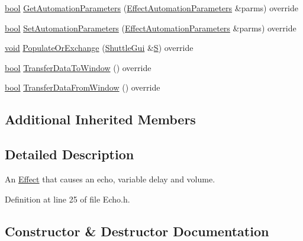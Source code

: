 \begin{DoxyCompactItemize}
\item 
\hyperlink{mac_2config_2i386_2lib-src_2libsoxr_2soxr-config_8h_abb452686968e48b67397da5f97445f5b}{bool} \hyperlink{class_effect_echo_a85a2155e5dce81b86c925ddaf684568d}{Get\+Automation\+Parameters} (\hyperlink{class_effect_automation_parameters}{Effect\+Automation\+Parameters} \&parms) override
\item 
\hyperlink{mac_2config_2i386_2lib-src_2libsoxr_2soxr-config_8h_abb452686968e48b67397da5f97445f5b}{bool} \hyperlink{class_effect_echo_a71d625517288e20ce9bc1bb45ff4bb6f}{Set\+Automation\+Parameters} (\hyperlink{class_effect_automation_parameters}{Effect\+Automation\+Parameters} \&parms) override
\item 
\hyperlink{sound_8c_ae35f5844602719cf66324f4de2a658b3}{void} \hyperlink{class_effect_echo_a2b785288a35006a2ab8f5b4f39337ac2}{Populate\+Or\+Exchange} (\hyperlink{class_shuttle_gui}{Shuttle\+Gui} \&\hyperlink{xlftab_8c_af933676109efed7ab34cea71d748a517}{S}) override
\item 
\hyperlink{mac_2config_2i386_2lib-src_2libsoxr_2soxr-config_8h_abb452686968e48b67397da5f97445f5b}{bool} \hyperlink{class_effect_echo_a89d4977d998b0d2878937d0ff4c7cdf0}{Transfer\+Data\+To\+Window} () override
\item 
\hyperlink{mac_2config_2i386_2lib-src_2libsoxr_2soxr-config_8h_abb452686968e48b67397da5f97445f5b}{bool} \hyperlink{class_effect_echo_ac4b76609b894abc504d38841c3e3c7c1}{Transfer\+Data\+From\+Window} () override
\end{DoxyCompactItemize}
\subsection*{Additional Inherited Members}


\subsection{Detailed Description}
An \hyperlink{class_effect}{Effect} that causes an echo, variable delay and volume. 

Definition at line 25 of file Echo.\+h.



\subsection{Constructor \& Destructor Documentation}
